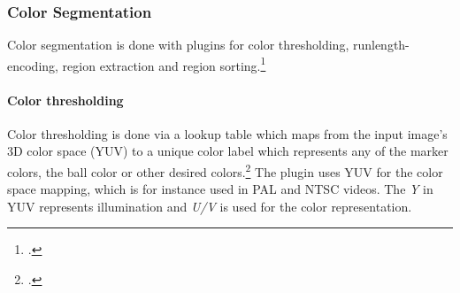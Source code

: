 \subsubsection{Color Segmentation}
Color segmentation is done with plugins for color thresholding, runlength-encoding,
region extraction and region sorting.\footcite[Cf.][]{zickler_ssl_vision}

\paragraph{Color thresholding}
Color thresholding is done via a lookup table which maps from the input image's
3D color space (YUV) to a unique color label which represents any of the marker
colors, the ball color or other desired colors.\footcite[Cf.][p. 4 et sq.]{zickler_ssl_vision}
The plugin uses YUV for the color space mapping, which is for instance used
in PAL and NTSC videos. The \textit{Y} in YUV represents illumination and
\textit{U/V} is used for the color representation.

